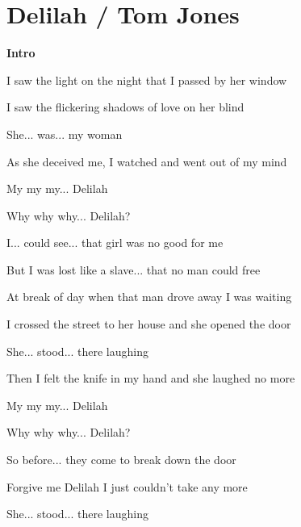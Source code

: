 \section{Delilah / Tom Jones}\label{sec:delilah}
\Eminor
\Bseven
\EmajorEasy
\Eseven
\Aminor
\Dseven
\Gmajor
\Gseven
\Cmajor
\Aseven
\Amajor



\textbf{Intro} 

I saw the light on the night that I passed by her window

I saw the flickering shadows of love on her blind

She... was... my woman

As she deceived me, I watched and went out of my mind


My my my... Delilah

Why why why... Delilah?

I... could see... that girl was no good for me

But I was lost like a slave... that no man could free 

At break of day when that man drove away I was waiting

I crossed the street to her house and she opened the door

She... stood... there laughing

Then I felt the knife in my hand and she laughed no more


My my my... Delilah

Why why why... Delilah?

So before... they come to break down the door

Forgive me Delilah I just couldn’t take any more 

   

She... stood... there laughing

